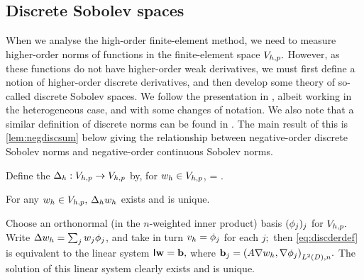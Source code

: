 \subsection{Discrete Sobolev spaces}\label{sec:discsob}
When we analyse the high-order finite-element method, we need to measure higher-order norms of functions in the finite-element space $V_{h,p}.$ However, as these functions do not have higher-order weak derivatives, we must first define a notion of higher-order discrete derivatives, and then develop some theory of so-called discrete Sobolev spaces. We follow the presentation in \cite{DuWu:15}, albeit working in the heterogeneous case, and with some changes of notation. We also note that a similar definition of discrete norms can be found in \cite[p. 238 ff.]{Br:07}. The main result of this  is \cref{lem:negdiscsum} below giving the relationship between negative-order discrete Sobolev norms and negative-order continuous Sobolev norms.

Define the  $\Delta_{h}:V_{h,p}\rightarrow V_{h,p}$ by, for $w_{h} \in V_{h,p}$,
\beq\label{eq:discderdef}
\IPLtDn{\Deltah \wh}{\vh} =  \tforall \vh \in \Vhp.
\eeq
\ede

\label{lem:ddwd}
For any $w_{h} \in V_{h,p},$ $\Delta_{h} w_{h}$ exists and is unique.
\ele

Choose an orthonormal (in the $n$-weighted inner product) basis  $(\phi_{j})_j$ for $V_{h,p}.$ Write $\Delta w_{h} = \sum_j w_{j} \phi_{j}$, and take in turn $v_{h} = \phi_{j}$ for each $j;$ then \cref{eq:discderdef} is equivalent to the linear system $\mathsf{I} \mathbf{w} = \mathbf{b},$ where $\bb_{j} = \IPLtDn{A \grad \wh}{\grad \phij}.$ The solution of this linear system clearly exists and is unique.
\epf

